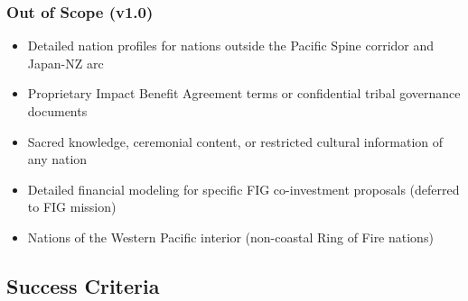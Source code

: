\documentclass[11pt,letterpaper]{article}
\begin{document}
\subsubsection{Out of Scope (v1.0)}

\begin{itemize}
  \item Detailed nation profiles for nations outside the Pacific Spine corridor and Japan-NZ arc
  \item Proprietary Impact Benefit Agreement terms or confidential tribal governance documents
  \item Sacred knowledge, ceremonial content, or restricted cultural information of any nation
  \item Detailed financial modeling for specific FIG co-investment proposals (deferred to FIG mission)
  \item Nations of the Western Pacific interior (non-coastal Ring of Fire nations)
\end{itemize}

\subsection{Success Criteria}
\end{document}
